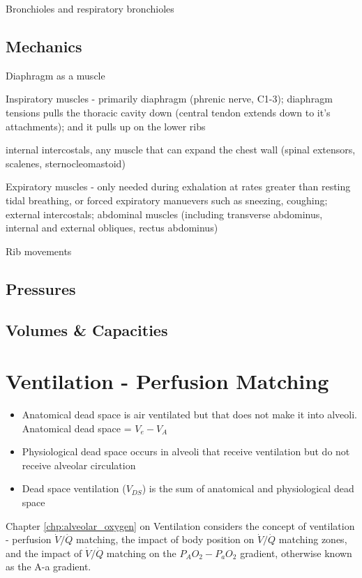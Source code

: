 Bronchioles and respiratory bronchioles

\subsection{Mechanics}

Diaphragm as a muscle


Inspiratory muscles - primarily diaphragm (phrenic nerve, C1-3); diaphragm tensions pulls the thoracic cavity down (central tendon extends down to it's attachments); and it pulls up on the lower ribs


internal intercostals, any muscle that can expand the chest wall (spinal extensors, scalenes, sternocleomastoid)

Expiratory muscles - only needed during exhalation at rates greater than resting tidal breathing, or forced expiratory manuevers such as sneezing, coughing; external intercostals; abdominal muscles (including transverse abdominus, internal and external obliques, rectus abdominus)

Rib movements


\subsection{Pressures}

\subsection{Volumes \& Capacities}



\section{Ventilation - Perfusion Matching}

\begin{itemize}
       \item Anatomical dead space is air ventilated but that does not make it into alveoli. Anatomical dead space = $V_e - V_A$
    \item Physiological dead space occurs in alveoli that receive ventilation but do not receive alveolar circulation
    \item Dead space ventilation ($V_{DS}$) is the sum of anatomical and physiological dead space
\end{itemize}


Chapter \ref{chp:alveolar_oxygen} on Ventilation considers the concept of ventilation - perfusion $\dot{V}/\dot{Q}$ matching, the impact of body position on $\dot{V}/\dot{Q}$ matching zones, and the impact of $\dot{V}/\dot{Q}$ matching on the $P_AO_2-P_aO_2$ gradient, otherwise known as the A-a gradient.
